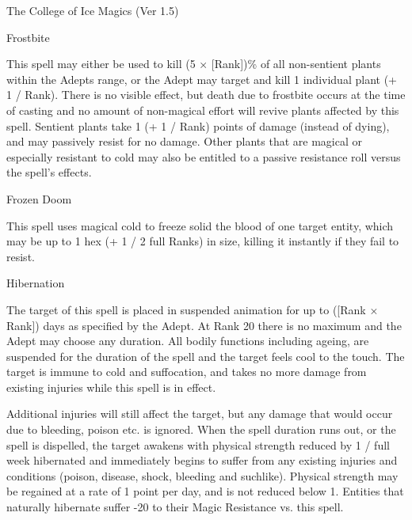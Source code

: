 \begin{Chapter}{The College of Ice Magics (Ver 1.5)}
\begin{spell}[S-4]{Frostbite}
\begin{effects}
 This spell may either be used to kill (5 × [Rank])\% of all
 non-sentient plants within the Adepts range, or the Adept may target
 and kill 1 individual plant (+ 1 / Rank).  There is no visible
 effect, but death due to frostbite occurs at the time of casting and
 no amount of non-magical effort will revive plants affected by this
 spell.  Sentient plants take 1 (+ 1 / Rank) points of damage (instead
 of dying), and may passively resist for no damage. Other plants that
 are magical or especially resistant to cold may also be entitled to a
 passive resistance roll versus the spell’s effects.
\end{effects}
\end{spell}

\begin{spell}[S-5]{Frozen Doom}
\begin{effects}
This spell uses magical cold to freeze solid the blood of one target
entity, which may be up to 1 hex (+ 1 / 2 full Ranks) in size, killing
it instantly if they fail to resist.
\end{effects}
\end{spell}

\begin{spell}[S-6]{Hibernation}
\begin{effects}
The target of this spell is placed in suspended animation for up to
([Rank × Rank]) days as specified by the Adept.  At Rank 20 there is
no maximum and the Adept may choose any duration.  All bodily
functions including ageing, are suspended for the duration of the
spell and the target feels cool to the touch.  The target is immune to
cold and suffocation, and takes no more damage from existing injuries
while this spell is in effect.

Additional injuries will still affect the target, but any damage that
would occur due to bleeding, poison etc. is ignored. When the spell
duration runs out, or the spell is dispelled, the target awakens with
physical strength reduced by 1 / full week hibernated and immediately
begins to suffer from any existing injuries and conditions (poison,
disease, shock, bleeding and suchlike).  Physical strength may be
regained at a rate of 1 point per day, and is not reduced below
1. Entities that naturally hibernate suffer -20 to their Magic
Resistance vs. this spell.
\end{effects}
\end{spell}


\end{Chapter}
